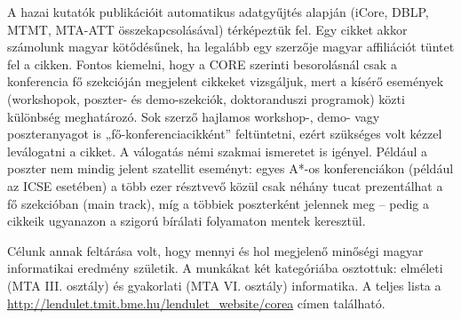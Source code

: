 \documentclass[12pt,a4paper]{article}
\begin{document}
A hazai kutatók publikációit automatikus adatgyűjtés alapján (iCore, DBLP, MTMT, MTA-ATT összekapcsolásával) térképeztük fel. Egy cikket akkor számolunk magyar kötődésűnek, ha legalább egy szerzője magyar affiliációt tüntet fel a cikken. Fontos kiemelni, hogy a CORE szerinti besorolásnál csak a konferencia fő szekcióján megjelent cikkeket vizsgáljuk, mert a kísérő események (workshopok, poszter- és demo-szekciók, doktoranduszi programok) közti különbség meghatározó. Sok szerző hajlamos workshop-, demo- vagy poszteranyagot is „fő-konferenciacikként” feltüntetni, ezért szükséges volt kézzel leválogatni a cikket. A válogatás némi szakmai ismeretet is igényel. Például a poszter nem mindig jelent szatellit eseményt: egyes A\!*-os konferenciákon (például az ICSE esetében) a több ezer résztvevő közül csak néhány tucat prezentálhat a fő szekcióban (main track), míg a többiek poszterként jelennek meg – pedig a cikkeik ugyanazon a szigorú bírálati folyamaton mentek keresztül.


Célunk annak feltárása volt, hogy mennyi és hol megjelenő minőségi magyar informatikai eredmény születik. A munkákat két kategóriába osztottuk: elméleti (MTA III. osztály) és gyakorlati (MTA VI. osztály) informatika. 
%
%
%
 A teljes lista a  \url{http://lendulet.tmit.bme.hu/lendulet_website/corea} címen található.



%
\end{document}
